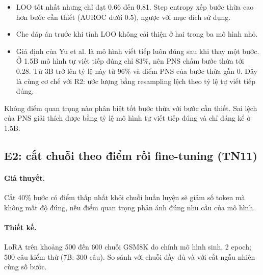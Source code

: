 \documentclass[11pt]{article}
\begin{document}
\begin{cachdoc}
\begin{itemize}[leftmargin=*,itemsep=1pt]
\item LOO tốt nhất nhưng chỉ đạt 0.66 đến 0.81. Step entropy xếp bước thừa cao hơn bước cần thiết (AUROC
  dưới 0.5), ngược với mục đích sử dụng.
\item Che đáp án trước khi tính LOO không cải thiện ở hai trong ba mô hình nhỏ.
\item Giả định của Yu et al. là mô hình viết tiếp luôn đúng sau khi thay một bước. Ở 1.5B mô hình tự viết
  tiếp đúng chỉ 83\%, nên PNS chấm bước thừa tới 0.28. Từ 3B trở lên tỷ lệ này từ 96\% và điểm PNS của bước
  thừa gần 0. Đây là cùng cơ chế với R2: ước lượng bằng resampling lệch theo tỷ lệ tự viết tiếp đúng.
\end{itemize}
\end{cachdoc}

\begin{ketluan}
Không điểm quan trọng nào phân biệt tốt bước thừa với bước cần thiết. Sai lệch của PNS giải thích được bằng
tỷ lệ mô hình tự viết tiếp đúng và chỉ đáng kể ở 1.5B.
\end{ketluan}

\subsection{E2: cắt chuỗi theo điểm rồi fine-tuning (TN11)}

\paragraph{Giả thuyết.} Cắt 40\% bước có điểm thấp nhất khỏi chuỗi huấn luyện sẽ giảm số token mà không
mất độ đúng, nếu điểm quan trọng phản ánh đúng nhu cầu của mô hình.

\paragraph{Thiết kế.} LoRA trên khoảng 500 đến 600 chuỗi GSM8K do chính mô hình sinh, 2 epoch; 500 câu
kiểm thử (7B: 300 câu). So sánh với chuỗi đầy đủ và với cắt ngẫu nhiên cùng số bước.
\end{document}
